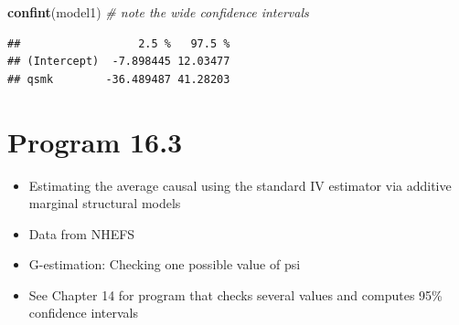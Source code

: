 \documentclass[
  10pt,
]{book}
\newenvironment{Shaded}{\begin{snugshade}}{\end{snugshade}}
\newcommand{\CommentTok}[1]{\textcolor[rgb]{0.56,0.35,0.01}{\textit{#1}}}
\newcommand{\DataTypeTok}[1]{\textcolor[rgb]{0.13,0.29,0.53}{#1}}
\newcommand{\DecValTok}[1]{\textcolor[rgb]{0.00,0.00,0.81}{#1}}
\newcommand{\FloatTok}[1]{\textcolor[rgb]{0.00,0.00,0.81}{#1}}
\newcommand{\KeywordTok}[1]{\textcolor[rgb]{0.13,0.29,0.53}{\textbf{#1}}}
\newcommand{\NormalTok}[1]{#1}
\newcommand{\OperatorTok}[1]{\textcolor[rgb]{0.81,0.36,0.00}{\textbf{#1}}}
\newcommand{\StringTok}[1]{\textcolor[rgb]{0.31,0.60,0.02}{#1}}
\providecommand{\tightlist}{%
  \setlength{\itemsep}{0pt}\setlength{\parskip}{0pt}}
\begin{document}
\begin{Shaded}
\begin{Highlighting}[]
\KeywordTok{confint}\NormalTok{(model1)  }\CommentTok{\# note the wide confidence intervals}
\end{Highlighting}
\end{Shaded}

\begin{verbatim}
##                  2.5 %   97.5 %
## (Intercept)  -7.898445 12.03477
## qsmk        -36.489487 41.28203
\end{verbatim}

\hypertarget{program-16.3}{%
\section{Program 16.3}\label{program-16.3}}

\begin{itemize}
\tightlist
\item
  Estimating the average causal using the standard IV estimator via additive marginal structural models
\item
  Data from NHEFS
\item
  G-estimation: Checking one possible value of psi
\item
  See Chapter 14 for program that checks several values and computes 95\% confidence intervals
\end{itemize}

\begin{Shaded}
\end{Shaded}
\end{document}
